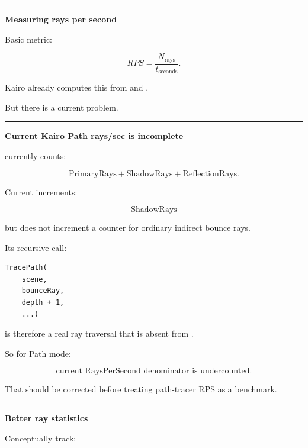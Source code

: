 \begin{center}\rule{0.5\linewidth}{0.5pt}\end{center}

\textbf{Measuring rays per second}

Basic metric:

\[
\boxed{
RPS
=
\frac{
N_{\text{rays}}
}{
t_{\text{seconds}}
}.
}
\]

Kairo already computes this from  and .

But there is a current problem.

\begin{center}\rule{0.5\linewidth}{0.5pt}\end{center}

\textbf{Current Kairo Path rays/sec is incomplete}

 currently counts:

\[
\text{PrimaryRays}
+
\text{ShadowRays}
+
\text{ReflectionRays}.
\]

Current  increments:

\[
\text{ShadowRays}
\]

but does not increment a counter for ordinary indirect bounce rays.

Its recursive call:

\begin{verbatim}
TracePath(
    scene,
    bounceRay,
    depth + 1,
    ...)
\end{verbatim}

is therefore a real ray traversal that is absent from .

So for Path mode:

\[
\boxed{
\text{current RaysPerSecond denominator is undercounted}.
}
\]

That should be corrected before treating path-tracer RPS as a benchmark.

\begin{center}\rule{0.5\linewidth}{0.5pt}\end{center}

\textbf{Better ray statistics}

Conceptually track:

